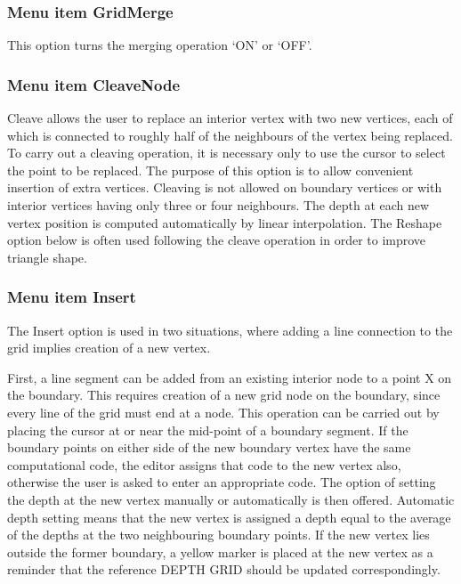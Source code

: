 \documentclass{article}
\begin{document}
\subsubsection*{}
\subsubsection[Menu item GridMerge]{Menu item GridMerge}
This option turns the merging operation `ON' or `OFF'.

\subsubsection[Menu item CleaveNode]{Menu item CleaveNode}
Cleave allows the user to replace an interior vertex with two new vertices, each of which is connected to roughly half of the neighbours of the vertex being replaced. To carry out a cleaving operation, it is necessary only to use the cursor to select the point to be replaced. The purpose of this option is to allow convenient insertion of extra vertices. Cleaving is not allowed on boundary vertices or with interior vertices having only three or four neighbours. The depth at each new vertex position is computed automatically by linear interpolation. The Reshape option below is often used following the cleave operation in order to improve triangle shape.

\subsubsection[Menu item Insert]{Menu item Insert}
The Insert option is used in two situations, where adding a line connection to the grid implies creation of a new vertex. 

First, a line segment can be added from an existing interior node to a point X on the boundary. This requires creation of a new grid node on the boundary, since every line of the grid must end at a node. This operation can be carried out by placing the cursor at or near the mid-point of a boundary segment. If the boundary points on either side of the new boundary vertex have the same computational code, the editor assigns that code to the new vertex also, otherwise the user is asked to enter an appropriate code. The option of setting the depth at the new vertex manually or automatically is then offered. Automatic depth setting means that the new vertex is assigned a depth equal to the average of the depths at the two neighbouring boundary points. If the new vertex lies outside the former boundary, a yellow marker is placed at the new vertex as a reminder that the reference DEPTH GRID should be updated correspondingly.
\end{document}

